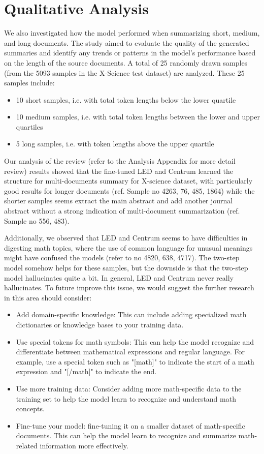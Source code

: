 \documentclass[12pt, twocolumn]{article}
\numberwithin{equation}{section}
\begin{document}
\section{Qualitative Analysis}
\label{sec:qualitative}

We also investigated how the model performed when summarizing short, medium, and long documents. The study aimed to evaluate the quality of the generated summaries and identify any trends or patterns in the model's performance based on the length of the source documents. A total of 25 randomly drawn samples (from the 5093 samples in the X-Science test dataset) are analyzed.  These 25 samples include:

\begin{itemize}
    \item 10 short samples, i.e. with total token lengths below the lower quartile
    \item 10 medium samples, i.e. with total token lengths between the lower and upper quartiles
    \item 5 long samples, i.e. with token lengths above the upper quartile
\end{itemize}

Our analysis of the review (refer to the Analysis Appendix for more detail review) results showed that the fine-tuned LED and Centrum learned the structure for multi-documents summary for X-science dataset, with particularly good results for longer documents (ref. Sample no 4263, 76, 485, 1864) while the shorter samples seems extract the main abstract and add another journal abstract without a strong indication of multi-document summarization (ref. Sample no 556, 483).

Additionally, we observed that LED and Centrum seems to have difficulties in digesting math topics, where the use of common language for unusual meanings might have confused the models (refer to no 4820, 638, 4717).  The two-step model somehow helps for these samples, but the downside is that the two-step model hallucinates quite a bit. In general, LED and Centrum never really hallucinates. To future improve this issue, we would suggest the further research in this area should consider:

\begin{itemize}
    \item Add domain-specific knowledge: This can include adding specialized math dictionaries or knowledge bases to your training data.
    \item Use special tokens for math symbols: This can help the model recognize and differentiate between mathematical expressions and regular language. For example, use a special token such as "[math]" to indicate the start of a math expression and "[/math]" to indicate the end.
    \item Use more training data: Consider adding more math-specific data to the training set to help the model learn to recognize and understand math concepts.
    \item Fine-tune your model: fine-tuning it on a smaller dataset of math-specific documents. This can help the model learn to recognize and summarize math-related information more effectively.
\end{itemize}
\end{document}
